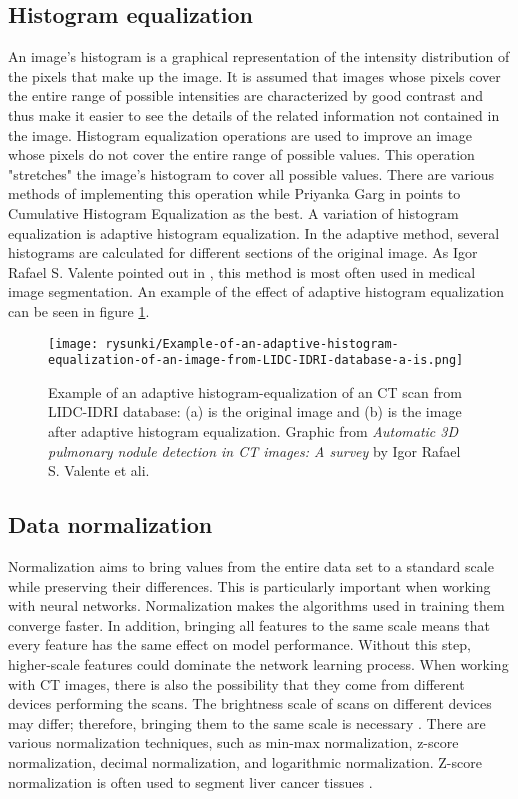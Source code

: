 \subsection{Histogram equalization}
An image's histogram is a graphical representation of the intensity distribution of the pixels that make up the image. It is assumed that images whose pixels cover the entire range of possible intensities are characterized by good contrast and thus make it easier to see the details of the related information not contained in the image. Histogram equalization operations are used to improve an image whose pixels do not cover the entire range of possible values. This operation "stretches" the image's histogram to cover all possible values. There are various methods of implementing this operation while Priyanka Garg in \cite{garg_comparative_2017} points to Cumulative Histogram Equalization as the best. A variation of histogram equalization is adaptive histogram equalization. In the adaptive method, several histograms are calculated for different sections of the original image. As Igor Rafael S. Valente pointed out in \cite{valente_automatic_2016}, this method is most often used in medical image segmentation. An example of the effect of adaptive histogram equalization can be seen in figure \ref{rys:hist_eq}.



\begin{figure}[!h]
	\centering \texttt{[image: rysunki/Example-of-an-adaptive-histogram-equalization-of-an-image-from-LIDC-IDRI-database-a-is.png]}
	\caption{Example of an adaptive histogram-equalization of an CT scan from LIDC-IDRI database: (a) is the original image and (b) is the image after adaptive histogram equalization. Graphic from  \textit{Automatic 3D pulmonary nodule detection in CT images: A survey} by Igor Rafael S. Valente et ali.}
	\label{rys:hist_eq}
\end{figure}
\subsection{Data normalization}

Normalization aims to bring values from the entire data set to a standard scale while preserving their differences. This is particularly important when working with neural networks. Normalization makes the algorithms used in training them converge faster. In addition, bringing all features to the same scale means that every feature  has the same effect on model performance. Without this step, higher-scale features could dominate the network learning process. When working with CT images, there is also the possibility that they come from different devices performing the scans. The brightness scale of scans on different devices may differ; therefore, bringing them to the same scale is necessary \cite{truong_medical_2018}. There are various normalization techniques, such as min-max normalization, z-score normalization, decimal normalization, and logarithmic normalization. Z-score normalization is often used to segment liver cancer tissues \cite{islam_evaluation_2021}.


